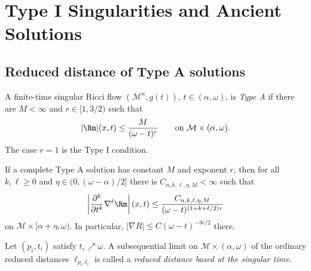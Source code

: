 \chapter[30]{Type I Singularities and Ancient Solutions}
\label{ch:chow-iv-type-i-singularities-ancient-solutions}

\section{Reduced distance of Type A solutions}

\begin{definition}
\label{def:chow-iv-type-a-singular-solution}
A finite-time singular Ricci flow
\((\mathcal M^n,g(t))\), \(t\in(\alpha,\omega)\), is \emph{Type A} if there
are \(M<\infty\) and \(r\in[1,3/2)\) such that
\[
 |\Rm|(x,t)\leq \frac{M}{(\omega-t)^r}
 \qquad\text{on }\mathcal M\times(\alpha,\omega).
\]
The case \(r=1\) is the Type I condition.
\end{definition}

\begin{lemma}
\label{lem:chow-iv-shi-estimates-type-a}
If a complete Type A solution has constant \(M\) and exponent \(r\), then for
all \(k,\ell\geq0\) and
\(\eta\in(0,(\omega-\alpha)/2]\) there is
\(C_{n,k,\ell,\eta,M}<\infty\) such that
\[
 \left|\frac{\partial^k}{\partial t^k}\nabla^\ell\Rm\right|(x,t)
 \leq \frac{C_{n,k,\ell,\eta,M}}
 {(\omega-t)^{(1+k+\ell/2)r}}
\]
on \(\mathcal M\times[\alpha+\eta,\omega)\).  In particular,
\(|\nabla R|\leq C(\omega-t)^{-3r/2}\) there.
\end{lemma}

\begin{definition}
\label{def:chow-iv-reduced-distance-singular-time}
Let \((p_i,t_i)\) satisfy \(t_i\nearrow\omega\).  A subsequential limit on
\(\mathcal M\times(\alpha,\omega)\) of the ordinary reduced distances
\(\ell_{p_i,t_i}\) is called a \emph{reduced distance based at the singular
time}.
\end{definition}

